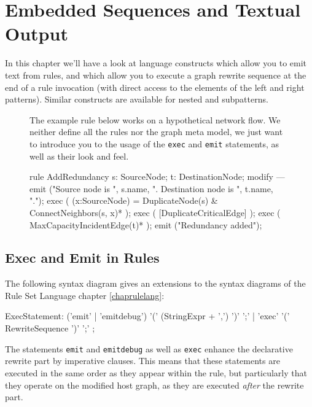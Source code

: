 \chapter{Embedded Sequences and Textual Output}
\label{cha:imperativeandstate}
\label{sct:imperative}

In this chapter we'll have a look at language constructs which allow you to emit text from rules, and which allow you to execute a graph rewrite sequence at the end of a rule invocation (with direct access to the elements of the left and right patterns).
Similar constructs are available for nested and subpatterns.

\begin{figure}[htbp]
\begin{example}
	The example rule below works on a hypothetical network flow.
	We neither define all the rules nor the graph meta model,
	we just want to introduce you to the usage of the \texttt{exec} and \texttt{emit} statements, as well as their look and feel.
	\begin{grgen}
rule AddRedundancy
{
  s: SourceNode;
  t: DestinationNode;
  modify {
  ---
    emit ("Source node is ", s.name, ". Destination node is ", t.name, ".");
    exec ( (x:SourceNode) = DuplicateNode(s) & ConnectNeighbors(s, x)* );
    exec ( [DuplicateCriticalEdge] );
    exec ( MaxCapacityIncidentEdge(t)* );
    emit ("Redundancy added");
  }
}
	\end{grgen}
\end{example}
\end{figure}

\section{Exec and Emit in Rules}\label{sct:execemitrules}

The following syntax diagram gives an extensions to the syntax diagrams of the Rule Set Language chapter \ref{chaprulelang}:
\begin{rail}
  ExecStatement: ('emit' | 'emitdebug') '(' (StringExpr + ',') ')' ';' | 'exec' '(' RewriteSequence ')' ';'
	;
\end{rail}

The statements \texttt{emit} and \texttt{emitdebug} as well as \texttt{exec} enhance the declarative rewrite part by imperative clauses.
This means that these statements are executed in the same order as they appear within the rule,
but particularly that they operate on the modified host graph, as they are executed \emph{after} the rewrite part.

